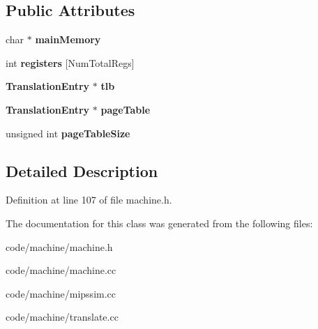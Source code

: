 \subsection*{Public Attributes}
\begin{DoxyCompactItemize}
\item 
char $\ast$ {\bfseries main\+Memory}\label{class_machine_aa2ad571478bcc8aa88cebe50fc533ec7}

\item 
int {\bfseries registers} [Num\+Total\+Regs]\label{class_machine_a97712e3db6165648d169598fdf26b756}

\item 
{\bf Translation\+Entry} $\ast$ {\bfseries tlb}\label{class_machine_a900108b92c72cfbcab9106d99be5a315}

\item 
{\bf Translation\+Entry} $\ast$ {\bfseries page\+Table}\label{class_machine_a9e4092e3d7bab29b7d1f54ad005527ca}

\item 
unsigned int {\bfseries page\+Table\+Size}\label{class_machine_a439af96b1d906dbea5dfb538d8491418}

\end{DoxyCompactItemize}


\subsection{Detailed Description}


Definition at line 107 of file machine.\+h.



The documentation for this class was generated from the following files\+:\begin{DoxyCompactItemize}
\item 
code/machine/machine.\+h\item 
code/machine/machine.\+cc\item 
code/machine/mipssim.\+cc\item 
code/machine/translate.\+cc\end{DoxyCompactItemize}
